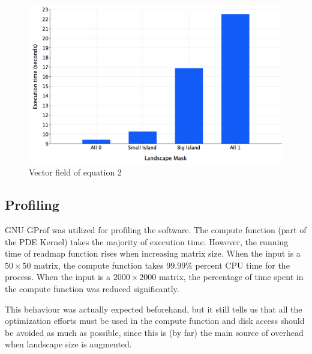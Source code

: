 \documentclass[12pt,a4paper]{article}
\begin{document}
\begin{figure}[hb]
    \centering
    \includegraphics[scale=0.3]{images/bargraph.png}
    \caption{Vector field of equation 2}
\end{figure}


\subsection{Profiling}

GNU GProf was utilized for profiling the software. The compute function (part of the PDE Kernel) takes the majority of execution time. However, the running time of readmap function rises when increasing matrix size. When the input is a $50\times 50$ matrix, the compute function takes $99.99\%$ percent CPU time for the process. When the input is a $2000\times 2000$  matrix, the percentage of time spent in the compute function was reduced significantly. 

This behaviour was actually expected beforehand, but it still tells us that all the optimization efforts must be used in the compute function and disk access should be avoided as much as possible, since this is (by far) the main source of overhead when landscape size is augmented.
\end{document}
